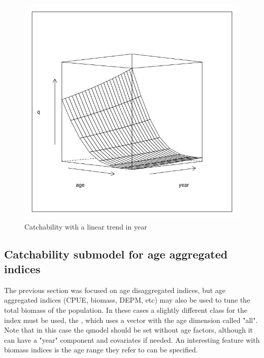 \documentclass[a4paper,english,10pt]{article}\usepackage[]{graphicx}\usepackage[]{color}
\makeatletter
\def\maxwidth{ %
  \ifdim\Gin@nat@width>\linewidth
    \linewidth
  \else
    \Gin@nat@width
  \fi
}
\newenvironment{knitrout}{}{} %
\makeatother
\begin{document}
\begin{knitrout}
\color{fgcolor}\begin{figure}[H]

{\centering \includegraphics[width=\maxwidth]{figure/qtrend-1} 

}

\caption[Catchability with a linear trend in year]{Catchability with a linear trend in year}\label{fig:qtrend}
\end{figure}


\end{knitrout}

\subsection{Catchability submodel for age aggregated indices}

The previous section was focused on age disaggregated indices, but age aggregated indices (CPUE, biomass, DEPM, etc) may also be used to tune the total biomass of the population. In these cases a slightly different class for the index must be used, the , which uses a vector  with the age dimension called "all". Note that in this case the qmodel should be set without age factors, although it can have a "year" component and covariates if needed. An interesting feature with biomass indices is the age range they refer to can be specified.
\end{document}
